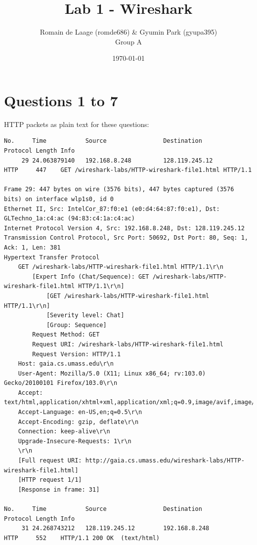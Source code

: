\documentclass[a4paper,11pt,final]{report}
\title{Lab 1 - Wireshark}
\author{Romain de Laage (romde686) \& Gyumin Park (gyupa395)\\Group A}
\date{\today}
\begin{document}
\maketitle
\chapter{Questions 1 to 7}

HTTP packets as plain text for these questions:
\begin{lstlisting}[breaklines]
No.     Time           Source                Destination           Protocol Length Info
     29 24.063879140   192.168.8.248         128.119.245.12        HTTP     447    GET /wireshark-labs/HTTP-wireshark-file1.html HTTP/1.1 

Frame 29: 447 bytes on wire (3576 bits), 447 bytes captured (3576 bits) on interface wlp1s0, id 0
Ethernet II, Src: IntelCor_87:f0:e1 (e0:d4:64:87:f0:e1), Dst: GLTechno_1a:c4:ac (94:83:c4:1a:c4:ac)
Internet Protocol Version 4, Src: 192.168.8.248, Dst: 128.119.245.12
Transmission Control Protocol, Src Port: 50692, Dst Port: 80, Seq: 1, Ack: 1, Len: 381
Hypertext Transfer Protocol
    GET /wireshark-labs/HTTP-wireshark-file1.html HTTP/1.1\r\n
        [Expert Info (Chat/Sequence): GET /wireshark-labs/HTTP-wireshark-file1.html HTTP/1.1\r\n]
            [GET /wireshark-labs/HTTP-wireshark-file1.html HTTP/1.1\r\n]
            [Severity level: Chat]
            [Group: Sequence]
        Request Method: GET
        Request URI: /wireshark-labs/HTTP-wireshark-file1.html
        Request Version: HTTP/1.1
    Host: gaia.cs.umass.edu\r\n
    User-Agent: Mozilla/5.0 (X11; Linux x86_64; rv:103.0) Gecko/20100101 Firefox/103.0\r\n
    Accept: text/html,application/xhtml+xml,application/xml;q=0.9,image/avif,image/webp,*/*;q=0.8\r\n
    Accept-Language: en-US,en;q=0.5\r\n
    Accept-Encoding: gzip, deflate\r\n
    Connection: keep-alive\r\n
    Upgrade-Insecure-Requests: 1\r\n
    \r\n
    [Full request URI: http://gaia.cs.umass.edu/wireshark-labs/HTTP-wireshark-file1.html]
    [HTTP request 1/1]
    [Response in frame: 31]

No.     Time           Source                Destination           Protocol Length Info
     31 24.268743212   128.119.245.12        192.168.8.248         HTTP     552    HTTP/1.1 200 OK  (text/html)


\end{lstlisting}
\end{document}
